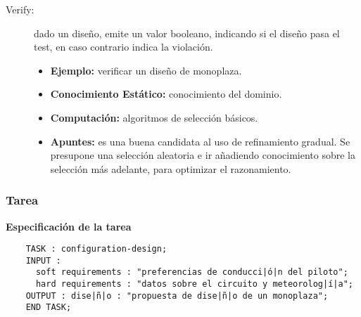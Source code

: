 \documentclass[12pt,a4paper,twoside,spanish]{article}      %
\begin{document}
\begin{description}
\begin{itemize}
        \end{itemize}
    \item [Verify:] dado un diseño, emite un valor booleano, indicando si el diseño pasa el test, en caso contrario indica la violación.
        \begin{itemize}
            \item \textbf {Ejemplo:} verificar un diseño de monoplaza.
            \item \textbf {Conocimiento Estático:} conocimiento del dominio.
            \item \textbf {Computación:} algoritmos de selección básicos.
            \item \textbf {Apuntes:} es una buena candidata al uso de refinamiento gradual. Se presupone una selección aleatoria e ir añadiendo conocimiento sobre la selección más adelante, para optimizar el razonamiento.
        \end{itemize}
\end{description}

\newpage
\subsubsection{Tarea}
\textbf {Especificación de la tarea}
\begin{lstlisting}
    TASK : configuration-design;
    INPUT :
      soft requirements : "preferencias de conducci|ó|n del piloto";
      hard requirements : "datos sobre el circuito y meteorolog|í|a";
    OUTPUT : dise|ñ|o : "propuesta de dise|ñ|o de un monoplaza";
    END TASK;
\end{lstlisting}
\end{document}
